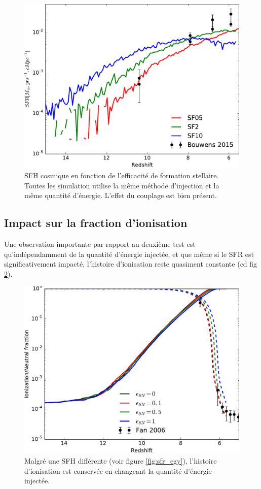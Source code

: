 \begin{figure}
        \includegraphics[width=.95\textwidth]{img/03/sedov/SFR_sfeff.pdf} 
        \caption[SFH cosmique en fonction de l'efficacité de formation stellaire]{SFH cosmique en fonction de l'efficacité de formation stellaire.
        Toutes les simulation utilise la même méthode d'injection et la même quantité d'énergie.
		L'effet du couplage est bien présent.
        }
 		\label{fig:sfr_sfe}
\end{figure}

\subsection{Impact sur la fraction d'ionisation}
\label{sec:pbfesc}
Une observation importante par rapport au deuxième test est qu’indépendamment de la quantité d'énergie injectée, et que même si le \ac{SFR} est significativement impacté, l'histoire d'ionisation reste quasiment constante (cd fig \ref{fig:xion_sneff}).

\begin{figure}
        \includegraphics[width=.95\textwidth]{img/03/sneff_xion.pdf} 
        \caption[Fonction d'ionisation en fonction de la quantité d'énergie injectée]{Malgré une SFH différente (voir figure \ref{fig:sfr_egy}), l'histoire d'ionisation est conservée en changeant la quantité d'énergie injectée.
        }
 		\label{fig:xion_sneff}
\end{figure}

